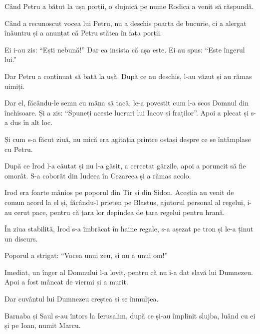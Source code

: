 {Când Petru a bătut la ușa porții, o slujnică pe nume Rodica a venit să răspundă.

Când a recunoscut vocea lui Petru, nu a deschis poarta de bucurie, ci a alergat înăuntru și a anunțat că Petru stătea în fața porții.


\par }{\PP {}Ei i-au zis: “Ești nebună!” Dar ea insista că așa este. Ei au spus: “Este îngerul lui.”

Dar Petru a continuat să bată la ușă. După ce au deschis, l-au văzut și au rămas uimiți.

Dar el, făcându-le semn cu mâna să tacă, le-a povestit cum l-a scos Domnul din închisoare. Și a zis: “Spuneți aceste lucruri lui Iacov și fraților”. Apoi a plecat și s-a dus în alt loc.


\par }{\PP {}Și cum s-a făcut ziuă, nu mică era agitația printre ostași despre ce se întâmplase cu Petru.

După ce Irod l-a căutat și nu l-a găsit, a cercetat gărzile, apoi a poruncit să fie omorât. S-a coborât din Iudeea în Cezareea și a rămas acolo.


\par }{\PP {}Irod era foarte mânios pe poporul din Tir și din Sidon. Aceștia au venit de comun acord la el și, făcându-l prieten pe Blastus, ajutorul personal al regelui, i-au cerut pace, pentru că țara lor depindea de țara regelui pentru hrană.

În ziua stabilită, Irod s-a îmbrăcat în haine regale, s-a așezat pe tron și le-a ținut un discurs.

Poporul a strigat: “Vocea unui zeu, și nu a unui om!”

Imediat, un înger al Domnului l-a lovit, pentru că nu i-a dat slavă lui Dumnezeu. Apoi a fost mâncat de viermi și a murit.


\par }{\PP {}Dar cuvântul lui Dumnezeu creștea și se înmulțea.

Barnaba și Saul s-au întors la
Ierusalim, după ce și-au împlinit slujba, luând cu ei și pe Ioan, numit Marcu.



\par }
